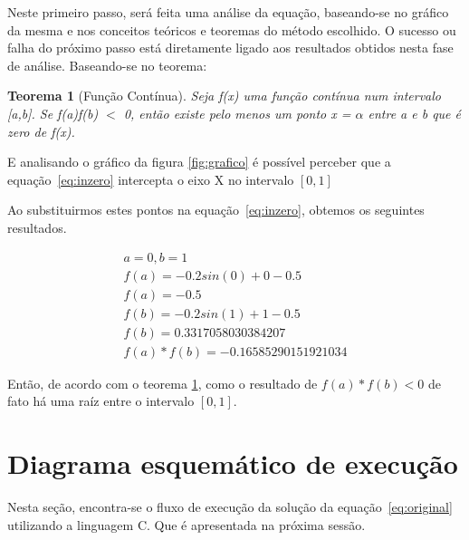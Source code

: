 \documentclass[12pt, hidelinks]{article}
\begin{document}
Neste primeiro passo, será feita uma análise da equação, baseando-se no gráfico da mesma e nos conceitos teóricos e teoremas do método escolhido. O sucesso ou falha do próximo passo está diretamente ligado aos resultados obtidos nesta fase de análise.
Baseando-se no teorema:
\newtheorem{ambiente}{Teorema}
\begin{ambiente}[Função Contínua]\label{teo:teorema}
  Seja f(x) uma função contínua num intervalo [a,b]. Se f(a)f(b) $<$ 0, então existe pelo menos um ponto
  x = $\alpha$ entre a e b que é zero de f(x).
\end{ambiente}

E analisando o gráfico da figura \ref{fig:grafico} é possível perceber que a equação~\eqref{eq:inzero} intercepta o eixo X no intervalo $[0,1]$

Ao substituirmos estes pontos na equação~\eqref{eq:inzero}, obtemos os seguintes resultados.

\begin{eqnarray}\label{eq:results}
  a = 0, b = 1 \nonumber\\
  f(a) =   -0.2sin(0) + 0 - 0.5 \nonumber\\
  f(a)= -0.5\nonumber\\
  f(b) =   -0.2sin(1) + 1 - 0.5 \nonumber\\
  f(b)= 0.3317058030384207 \nonumber\\
  f(a) * f(b) = -0.16585290151921034
\end{eqnarray}

Então, de acordo com o teorema \ref{teo:teorema}, como o resultado de $f(a) * f(b) < 0$ de fato há uma raíz entre o intervalo $[0,1]$.



\newpage
\section{Diagrama esquemático de execução}

Nesta seção, encontra-se o fluxo de execução da solução da equação~\eqref{eq:original} utilizando a linguagem C. Que é apresentada na próxima sessão.
\end{document}
